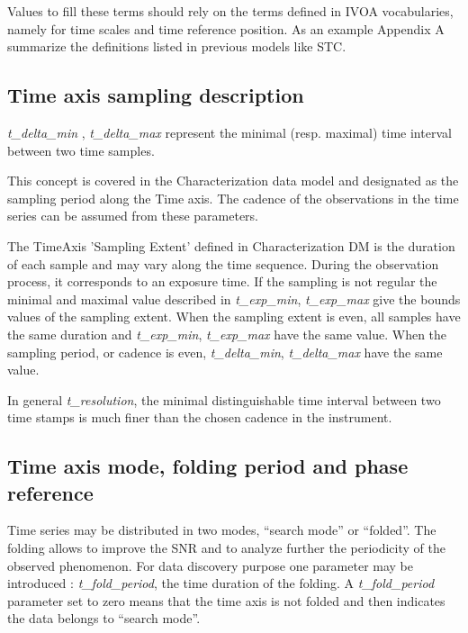 \documentclass[11pt,a4paper]{ivoa}
\begin{document}
Values to fill these terms should rely on the terms defined in IVOA vocabularies, namely for  time scales and time reference position.
As an example Appendix A summarize the definitions listed in previous models like STC.

\subsection{Time axis sampling description}
\emph{t\_delta\_min }, \emph{t\_delta\_max}  represent the minimal (resp. maximal) time interval between two time samples.

This concept is covered in the Characterization data model \citep{2008ivoa.spec.0325L} and designated as the sampling period along the Time axis.
The cadence of the observations in the time series can be assumed from these parameters.

 The TimeAxis 'Sampling Extent' defined in Characterization DM is the duration of each sample and may vary along the time sequence.
 During the observation process, it corresponds to an exposure time.
 If the sampling is not regular the minimal and maximal value described in \emph{t\_exp\_min}, \emph{t\_exp\_max} give the bounds values of the sampling extent.
When the sampling extent is even, all samples have the same duration and  \emph{t\_exp\_min}, \emph{t\_exp\_max} have the same value.
When the sampling period, or cadence  is even, \emph{t\_delta\_min}, \emph{t\_delta\_max} have the same value.

In general \emph{t\_resolution}, the minimal distinguishable time interval between two time stamps is  much finer than the chosen cadence in the instrument.  %

\subsection{Time axis mode, folding period  and phase reference}
Time series may be distributed in two modes, ``search mode'' or ``folded''.
The folding allows to improve the SNR and to analyze further the periodicity of the observed phenomenon.
For data discovery  purpose one parameter may be introduced : \emph{t\_fold\_period}, the time duration of the folding.
A \emph{t\_fold\_period} parameter set to zero means that the time axis is not folded  and then indicates the data belongs to ``search mode''.
\end{document}
